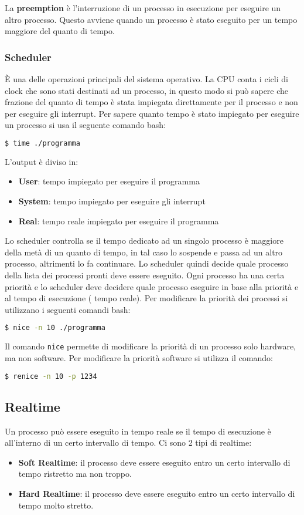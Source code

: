 \documentclass[a4paper]{article}
\theoremstyle{break}
\theoremstyle{break}
\theoremstyle{break}
\theoremstyle{break}
\begin{document}
\noindent La \textbf{preemption} è l'interruzione di un processo in esecuzione per
eseguire un altro processo. Questo avviene quando un processo è stato eseguito per
un tempo maggiore del quanto di tempo.

\subsubsection{Scheduler}
È una delle operazioni principali del sistema operativo. La CPU conta i cicli di clock
che sono stati destinati ad un processo, in questo modo si può sapere che frazione del
quanto di tempo è stata impiegata direttamente per il processo e non per eseguire gli
interrupt. Per sapere quanto tempo è stato impiegato per eseguire un processo si
usa il seguente comando bash:
\begin{lstlisting}[language=bash]
$ time ./programma
\end{lstlisting}
\noindent L'output è diviso in:
\begin{itemize}
	\item \textbf{User}: tempo impiegato per eseguire il programma
	\item \textbf{System}: tempo impiegato per eseguire gli interrupt
	\item \textbf{Real}: tempo reale impiegato per eseguire il programma
\end{itemize}

\vspace{1em}
\noindent Lo scheduler controlla se il tempo dedicato ad un singolo processo è maggiore
della metà di un quanto di tempo, in tal caso lo sospende e passa ad un altro processo,
altrimenti lo fa continuare. Lo scheduler quindi decide quale processo della lista dei
processi pronti deve essere eseguito. Ogni processo ha una certa priorità e lo scheduler
deve decidere quale processo eseguire in base alla priorità e al tempo di esecuzione (
tempo reale). Per modificare la priorità dei processi si utilizzano i seguenti comandi bash:
\begin{lstlisting}[language=bash]
$ nice -n 10 ./programma
\end{lstlisting}
\noindent Il comando \texttt{nice} permette di modificare la priorità di un processo solo
hardware, ma non software. Per modificare la priorità software si utilizza il comando:
\begin{lstlisting}[language=bash]
$ renice -n 10 -p 1234
\end{lstlisting}

\subsection{Realtime}
Un processo può essere eseguito in tempo reale se il tempo di esecuzione è all'interno
di un certo intervallo di tempo. Ci sono 2 tipi di realtime:
\begin{itemize}
	\item \textbf{Soft Realtime}: il processo deve essere eseguito entro un certo intervallo
	      di tempo ristretto ma non troppo.
	\item \textbf{Hard Realtime}: il processo deve essere eseguito entro un certo intervallo
	      di tempo molto stretto.
\end{itemize}
\end{document}
